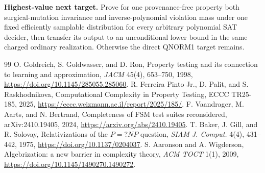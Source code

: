 \documentclass[11pt]{article}
\begin{document}
\textbf{Highest-value next target.} Prove for one provenance-free property
both surgical-mutation invariance and inverse-polynomial violation mass under
one fixed efficiently samplable distribution for every arbitrary polynomial
SAT decider, then transfer its output to an unconditional lower bound in the
same charged ordinary realization. Otherwise the direct QNORM1 target remains.

\begin{thebibliography}{99}
 O. Goldreich, S. Goldwasser, and D. Ron, Property testing and
its connection to learning and approximation, \emph{JACM} 45(4), 653--750,
1998, \url{https://doi.org/10.1145/285055.285060}.
 R. Ferreira Pinto Jr., D. Palit, and S. Raskhodnikova,
Computational Complexity in Property Testing, ECCC TR25-185, 2025,
\url{https://eccc.weizmann.ac.il/report/2025/185/}.
 F. Vaandrager, M. Aarts, and N. Bertrand, Completeness of FSM
test suites reconsidered, arXiv:2410.19405, 2024,
\url{https://arxiv.org/abs/2410.19405}.
 T. Baker, J. Gill, and R. Solovay, Relativizations of the
\(P=?NP\) question, \emph{SIAM J. Comput.} 4(4), 431--442, 1975,
\url{https://doi.org/10.1137/0204037}.
 S. Aaronson and A. Wigderson, Algebrization: a new barrier in
complexity theory, \emph{ACM TOCT} 1(1), 2009,
\url{https://doi.org/10.1145/1490270.1490272}.
\end{thebibliography}

\end{document}
